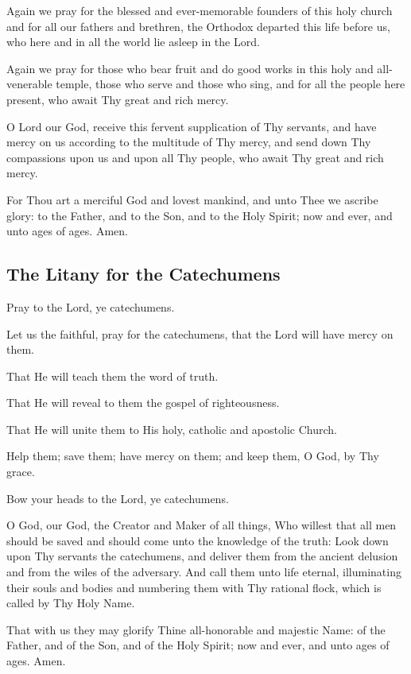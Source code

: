 Again we pray for the blessed and ever-memorable founders of this holy church and for  all our fathers and brethren, the Orthodox departed this life before us, who here and in all the world lie asleep in the Lord.

Again we pray for those who bear fruit and do good works in this holy and all-venerable temple, those who serve and those who sing, and for all the people here present, who await Thy great and rich mercy.
 
O Lord our God, receive this fervent supplication of Thy servants, and have mercy on us according to the multitude of Thy mercy, and send down Thy compassions upon us and upon all Thy people, who await Thy great and rich mercy.

For Thou art a merciful God and lovest mankind, and unto Thee we ascribe glory: to the Father, and to the Son, and to the Holy Spirit; now and ever, and unto ages of ages. Amen.

\subsection{The Litany for the Catechumens}

Pray to the Lord, ye catechumens.

Let us the faithful, pray for the catechumens, that the Lord will have mercy on them.

That He will teach them the word of truth.

That He will reveal to them the gospel of righteousness.

That He will unite them to His holy, catholic and apostolic Church.

Help them; save them; have mercy on them; and keep them, O God, by Thy grace.

Bow your heads to the Lord, ye catechumens.

O God, our God, the Creator and Maker of all things, Who willest that all men should be saved and should come unto the knowledge of the truth: Look down upon Thy servants the catechumens, and deliver them from the ancient delusion and from the wiles of the adversary. And call them unto life eternal, illuminating their souls and bodies and numbering them with Thy rational flock, which is called by Thy Holy Name.

That with us they may glorify Thine all-honorable and majestic Name: of the Father, and of the Son, and of the Holy Spirit; now and ever, and unto ages of ages. Amen.

